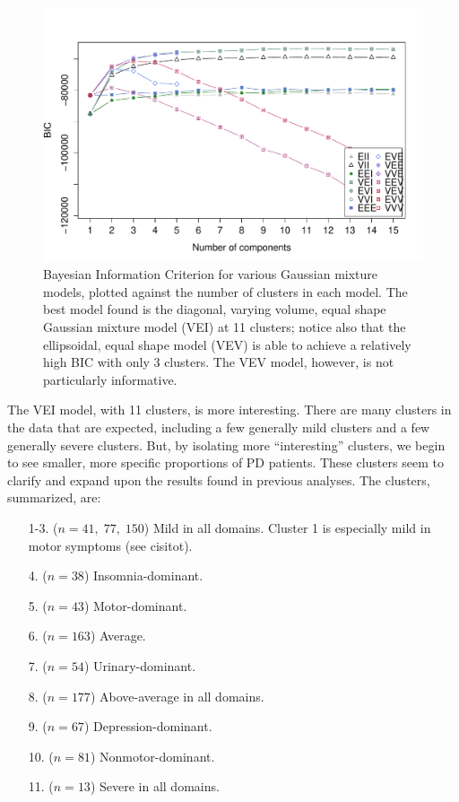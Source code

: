 \documentclass[10pt]{article}
\begin{document}
\begin{multicols}{2}
\begin{figure}[H]
  \centering
  \includegraphics[width=\linewidth]{nms30m-bic.pdf}
  \caption{Bayesian Information Criterion for various Gaussian mixture models, plotted against the
  number of clusters in each model. The best model found is the diagonal, varying volume, equal
shape Gaussian mixture model (VEI) at 11 clusters; notice also that the ellipsoidal, equal shape
model (VEV) is able to achieve a relatively high BIC with only 3 clusters. The VEV model, however,
is not particularly informative.}
  \label{fig:nms30m-bic}
\end{figure}

The VEI model, with 11 clusters, is more interesting. There are many clusters in the data that are
expected, including a few generally mild clusters and a few generally severe clusters.  But, by
isolating more ``interesting'' clusters, we begin to see smaller, more specific proportions of PD
patients. These clusters seem to clarify and expand upon the results found in previous analyses.
The clusters, summarized, are:

\begin{itemize}
  \item[1-3.] ($n = 41,\; 77,\; 150$) Mild in all domains. Cluster 1 is especially mild in motor
    symptoms (see cisitot).
  \item[4.] ($n = 38$) Insomnia-dominant.
  \item[5.] ($n = 43$) Motor-dominant.
  \item[6.] ($n = 163$) Average.
  \item[7.] ($n = 54$) Urinary-dominant.
  \item[8.] ($n = 177$) Above-average in all domains.
  \item[9.] ($n = 67$) Depression-dominant.
  \item[10.] ($n = 81$) Nonmotor-dominant.
  \item[11.] ($n = 13$) Severe in all domains.
\end{itemize}


\end{multicols}
\end{document}
